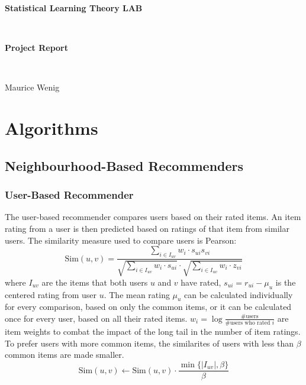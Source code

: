 \documentclass[12pt]{scrartcl}
\newcommand{\set}[1]{\{#1\}}
\newcommand{\abs}[1]{\left\vert #1 \right\vert}
\begin{document}
\thispagestyle{empty}
\begin{center}
	\begin{LARGE}
		\textbf{Statistical Learning Theory LAB}
	\end{LARGE}\vspace{3mm}\\
	\begin{Large}
		\textbf{Project Report}
	\end{Large}\vspace{5mm}\\
	\begin{large}
		Maurice Wenig
	\end{large}
\end{center}
\tableofcontents
\clearpage


\fancyhead[LO,RE]{\itshape\nouppercase\leftmark}
\section{Algorithms}
\subsection[Neighbourhood]{Neighbourhood-Based Recommenders}
\subsubsection[User-Based]{User-Based Recommender}
The user-based recommender compares users based on their rated items. An item rating from a user is then predicted based on ratings of that item from similar users.
The similarity measure used to compare users is Pearson:
$$\text{Sim}(u, v) = \frac{\sum\limits_{i\in I_{uv}} w_i \cdot s_{ui} s_{vi}}{\sqrt{\sum\limits_{i\in I_{uv}} w_i \cdot  s_{ui}} \cdot \sqrt{\sum\limits_{i\in I_{uv}} w_i \cdot  z_{vi}}}$$
where $I_{uv}$ are the items that both users $u$ and $v$ have rated, $s_{ui} = r_{ui} - \mu_u$ is the centered rating from user $u$.
The mean rating $\mu_u$ can be calculated individually for every comparison, based on only the common items, or it can be calculated once for every user, based on all their rated items.
$w_i = \log\frac{\text{\# users}}{\text{\# users who rated } i}$ are item weights to combat the impact of the long tail in the number of item ratings.
To prefer users with more common items, the similarites of users with less than $\beta$ common items are made smaller.
$$\text{Sim}(u, v) \gets \text{Sim}(u, v) \cdot \frac{\min\set{\abs{I_{uv}}, \beta}}{\beta}$$
\end{document}
